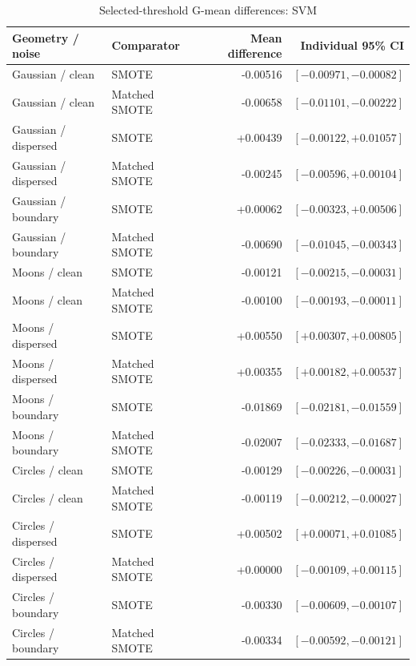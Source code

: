 \begin{table}[htbp]
\caption{Selected-threshold G-mean differences: SVM}
\centering\small
\begin{tabular}{llrr}
\hline
Geometry / noise & Comparator & Mean difference & Individual 95\% CI\\
\hline
Gaussian / clean & SMOTE & -0.00516 & $[-0.00971, -0.00082]$ \\
Gaussian / clean & Matched SMOTE & -0.00658 & $[-0.01101, -0.00222]$ \\
Gaussian / dispersed & SMOTE & +0.00439 & $[-0.00122, +0.01057]$ \\
Gaussian / dispersed & Matched SMOTE & -0.00245 & $[-0.00596, +0.00104]$ \\
Gaussian / boundary & SMOTE & +0.00062 & $[-0.00323, +0.00506]$ \\
Gaussian / boundary & Matched SMOTE & -0.00690 & $[-0.01045, -0.00343]$ \\
Moons / clean & SMOTE & -0.00121 & $[-0.00215, -0.00031]$ \\
Moons / clean & Matched SMOTE & -0.00100 & $[-0.00193, -0.00011]$ \\
Moons / dispersed & SMOTE & +0.00550 & $[+0.00307, +0.00805]$ \\
Moons / dispersed & Matched SMOTE & +0.00355 & $[+0.00182, +0.00537]$ \\
Moons / boundary & SMOTE & -0.01869 & $[-0.02181, -0.01559]$ \\
Moons / boundary & Matched SMOTE & -0.02007 & $[-0.02333, -0.01687]$ \\
Circles / clean & SMOTE & -0.00129 & $[-0.00226, -0.00031]$ \\
Circles / clean & Matched SMOTE & -0.00119 & $[-0.00212, -0.00027]$ \\
Circles / dispersed & SMOTE & +0.00502 & $[+0.00071, +0.01085]$ \\
Circles / dispersed & Matched SMOTE & +0.00000 & $[-0.00109, +0.00115]$ \\
Circles / boundary & SMOTE & -0.00330 & $[-0.00609, -0.00107]$ \\
Circles / boundary & Matched SMOTE & -0.00334 & $[-0.00592, -0.00121]$ \\
\hline
\end{tabular}
\end{table}
\clearpage
